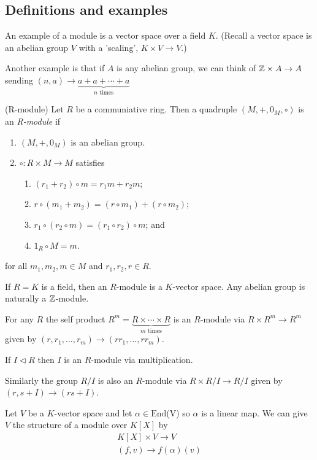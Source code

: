 \documentclass{article}
\newcommand{\nrm}{\triangleleft}
\begin{document}
\subsection{Definitions and examples}
An example of a module is a vector space over a field $ K $. (Recall a vector space is an abelian group $ V $ with a 'scaling', $ K\times V\to V $.)\par
Another example is that if $ A $ is any abelian group, we can think of $\mathbb{Z}\times A\to A $ sending $ (n,a)\to \underbrace{a+a+\cdots +a}_{n \text{ times} } $
\begin{definition}
	(R-module) Let $ R $ be a communiative ring. Then a quadruple $ (M,+,0_M,\circ) $ is an \textit{R-module} if
	\begin{enumerate}
		\item $ (M,+,0_M) $ is an abelian group.
		\item $ \circ:R\times M\to M $ satisfies
			\begin{enumerate}
				\item $ (r_1+r_2)\circ m = r_1m+r_2m $;
				\item $ r\circ (m_1+m_2) = (r\circ m_1)+(r\circ m_2)$;
				\item $ r_1\circ (r_2\circ m)=(r_1\circ r_2)\circ m $; and
				\item $ 1_R\circ M = m $.
			\end{enumerate}
	\end{enumerate}
	for all $ m_1,m_2,m\in M $ and $ r_1,r_2,r\in R $.
\end{definition}
If $ R=K $ is a field, then an $ R $-module is a $ K $-vector space. Any abelian group is naturally a $ \mathbb{Z} $-module.\par
For any $ R $ the self product $ R^m=\underbrace{R\times\cdots\times R}_{m \text{ times}} $ is an $ R $-module via $ R\times R^m\to R^m $ given by $ (r,r_1,\dots,r_m)\to (rr_1,\dots, rr_m) $.\par
If $ I\nrm R $ then $ I $ is an $ R $-module via multiplication.\par
Similarly the group $ R/I $ is also an $ R $-module via $ R\times R/I\to R/I $ given by $ (r,s+I)\to (rs+I) $.\par
Let $ V $ be a $ K $-vector space and let $ \alpha\in \mathrm{End} $(V)	so $ \alpha $ is a linear map. We can give $ V $ the structure of a module over $ K[X] $ by
\begin{align*}
	K[X]\times V\to V \\
	(f,v)\to f(\alpha)(v)
\end{align*}
\end{document}
